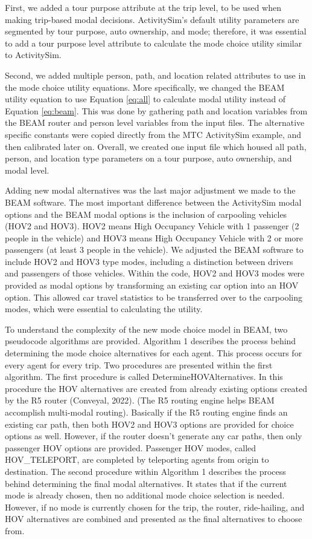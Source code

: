 \documentclass[fancy, masters]{byuthesis}
\begin{document}
First, we added a tour purpose attribute at the trip level, to be used when making trip-based modal decisions. ActivitySim's default utility parameters are segmented by tour purpose, auto ownership, and mode; therefore, it was essential to add a tour purpose level attribute to calculate the mode choice utility similar to ActivitySim.

Second, we added multiple person, path, and location related attributes to use in the mode choice utility equations. More specifically, we changed the BEAM utility equation to use Equation \eqref{eq:all} to calculate modal utility instead of Equation \eqref{eq:beam}. This was done by gathering path and location variables from the BEAM router and person level variables from the input files. The alternative specific constants were copied directly from the MTC ActivitySim example, and then calibrated later on. Overall, we created one input file which housed all path, person, and location type parameters on a tour purpose, auto ownership, and modal level.

Adding new modal alternatives was the last major adjustment we made to the BEAM software. The most important difference between the ActivitySim modal options and the BEAM modal options is the inclusion of carpooling vehicles (HOV2 and HOV3). HOV2 means High Occupancy Vehicle with 1 passenger (2 people in the vehicle) and HOV3 means High Occupancy Vehicle with 2 or more passengers (at least 3 people in the vehicle). We adjusted the BEAM software to include HOV2 and HOV3 type modes, including a distinction between drivers and passengers of those vehicles. Within the code, HOV2 and HOV3 modes were provided as modal options by transforming an existing car option into an HOV option. This allowed car travel statistics to be transferred over to the carpooling modes, which were essential to calculating the utility.

To understand the complexity of the new mode choice model in BEAM, two pseudocode algorithms are provided. Algorithm 1 describes the process behind determining the mode choice alternatives for each agent. This process occurs for every agent for every trip. Two procedures are presented within the first algorithm. The first procedure is called DetermineHOVAlternatives. In this procedure the HOV alternatives are created from already existing options created by the R5 router (Conveyal, 2022). (The R5 routing engine helps BEAM accomplish multi-modal routing). Basically if the R5 routing engine finds an existing car path, then both HOV2 and HOV3 options are provided for choice options as well. However, if the router doesn't generate any car paths, then only passenger HOV options are provided. Passenger HOV modes, called HOV\_TELEPORT, are completed by teleporting agents from origin to destination. The second procedure within Algorithm 1 describes the process behind determining the final modal alternatives. It states that if the current mode is already chosen, then no additional mode choice selection is needed. However, if no mode is currently chosen for the trip, the router, ride-hailing, and HOV alternatives are combined and presented as the final alternatives to choose from.
\end{document}

